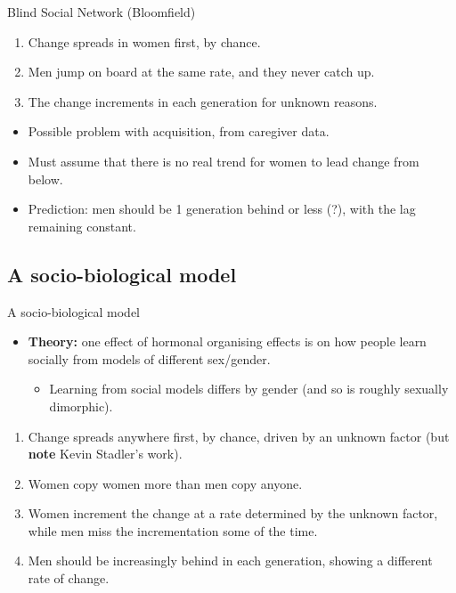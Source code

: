 \documentclass[hyperref={pdfpagelabels=false}]{beamer}
\begin{document}
\begin{frame}{Blind Social Network (Bloomfield)}
	\begin{enumerate}
	\item Change spreads in women first, by chance.
	\item Men jump on board at the same rate, and they never catch up.
	\item The change increments in each generation for unknown reasons.
	\end{enumerate}
	\begin{itemize}
	\item Possible problem with acquisition, from caregiver data.
	\item Must assume that there is no real trend for women to lead change from below.
	\item Prediction: men should be 1 generation behind or less (?), with the lag remaining constant.
	\end{itemize}
\end{frame}




\subsection{A socio-biological model}

\begin{frame}{A socio-biological model}
	\begin{itemize}
	\item[ ] \textbf{Theory:} one effect of hormonal organising effects is on how people learn socially from models of different sex/gender.
	\begin{itemize} \item Learning from social models differs by gender (and so is roughly sexually dimorphic). \end{itemize}
	\end{itemize}
	\begin{enumerate}
	\item Change spreads anywhere first, by chance, driven by an unknown factor (but \textbf{note} Kevin Stadler's work).
	\item Women copy women more than men copy anyone.
	\item Women increment the change at a rate determined by the unknown factor, while men miss the incrementation some of the time.
	\item Men should be increasingly behind in each generation, showing a different rate of change.
	\end{enumerate}

\end{frame}
\end{document}
